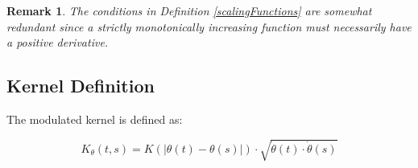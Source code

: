 \documentclass{article}
\newtheorem{remark}{Remark}
\newcommand{\dottheta}{\dot{\theta}}
\begin{document}
\begin{remark}
The conditions in Definition \ref{scalingFunctions} are somewhat redundant since a strictly monotonically increasing function must necessarily have a positive derivative.
\end{remark}

\subsection{Kernel Definition}

The modulated kernel is defined as:

\begin{equation}
K_\theta(t,s) = K(|\theta(t)-\theta(s)|) \cdot \sqrt{\dottheta(t) \cdot \dottheta(s)}
\end{equation}
\end{document}
